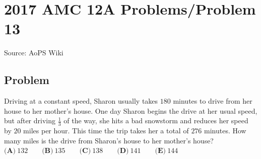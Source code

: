 \documentclass[12pt]{article}
\begin{document}
\section*{{2017 AMC 12A Problems/Problem 13}}
Source: AoPS Wiki

\subsection*{Problem}
Driving at a constant speed, Sharon usually takes $180$ minutes to drive from her house to her mother's house. One day Sharon begins the drive at her usual speed, but after driving $\frac{1}{3}$ of the way, she hits a bad snowstorm and reduces her speed by $20$ miles per hour. This time the trip takes her a total of $276$ minutes. How many miles is the drive from Sharon's house to her mother's house? $\textbf{(A)}\ 132 \qquad\textbf{(B)}\ 135 \qquad\textbf{(C)}\ 138 \qquad\textbf{(D)}\ 141 \qquad\textbf{(E)}\ 144$
\end{document}
